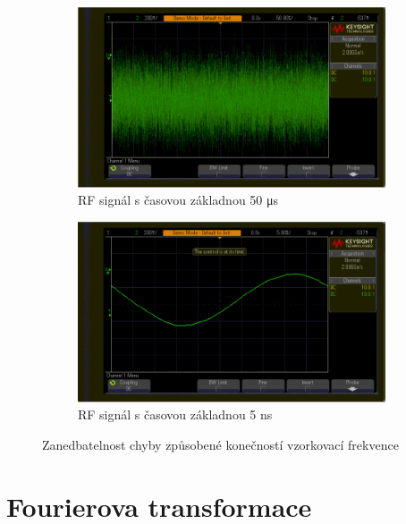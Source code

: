 \documentclass[twoside]{article}
\begin{document}
\begin{figure}[htbp]
	\centering
	\begin{subfigure}{0.45\textwidth}
		\includegraphics[width=\linewidth]{rf_captured50us_view50us.png                 }
		\caption{RF signál s časovou základnou 50 \si{\micro\second}}
		\label{fig:rf_50us}
	\end{subfigure}
	\begin{subfigure}{0.45\textwidth}
		\includegraphics[width=\linewidth]{rf_captured50us_view5ns.png                    }
		\caption{RF signál s časovou základnou 5 ns}
		\label{fig:rf_5ns}
	\end{subfigure}
	\caption{Zanedbatelnost chyby způsobené konečností vzorkovací frekvence}
\end{figure}

\section{Fourierova transformace}
\end{document}
